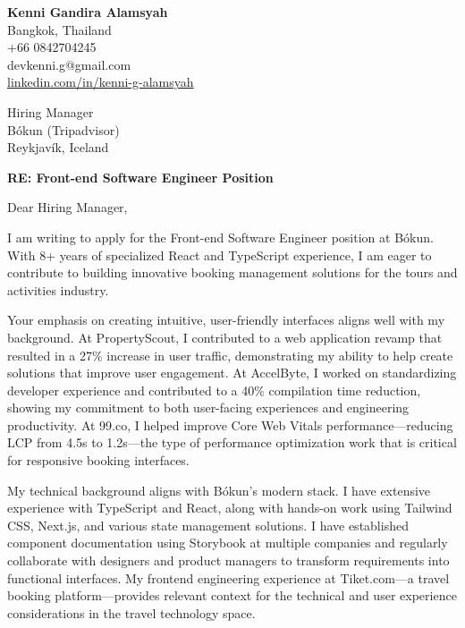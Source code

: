 \documentclass[11pt]{article}
\begin{document}
\begin{flushleft}
\textbf{Kenni Gandira Alamsyah}\\
Bangkok, Thailand\\
+66 0842704245\\
devkenni.g@gmail.com\\
\href{https://www.linkedin.com/in/kenni-g-alamsyah/}{linkedin.com/in/kenni-g-alamsyah}
\end{flushleft}

\vspace{1em}

\begin{flushleft}
Hiring Manager\\
Bókun (Tripadvisor)\\
Reykjavík, Iceland
\end{flushleft}

\vspace{1em}

\textbf{RE: Front-end Software Engineer Position}

\vspace{1em}

Dear Hiring Manager,

I am writing to apply for the Front-end Software Engineer position at Bókun. With 8+ years of specialized React and TypeScript experience, I am eager to contribute to building innovative booking management solutions for the tours and activities industry.

Your emphasis on creating intuitive, user-friendly interfaces aligns well with my background. At PropertyScout, I contributed to a web application revamp that resulted in a 27\% increase in user traffic, demonstrating my ability to help create solutions that improve user engagement. At AccelByte, I worked on standardizing developer experience and contributed to a 40\% compilation time reduction, showing my commitment to both user-facing experiences and engineering productivity. At 99.co, I helped improve Core Web Vitals performance—reducing LCP from 4.5s to 1.2s—the type of performance optimization work that is critical for responsive booking interfaces.

My technical background aligns with Bókun's modern stack. I have extensive experience with TypeScript and React, along with hands-on work using Tailwind CSS, Next.js, and various state management solutions. I have established component documentation using Storybook at multiple companies and regularly collaborate with designers and product managers to transform requirements into functional interfaces. My frontend engineering experience at Tiket.com—a travel booking platform—provides relevant context for the technical and user experience considerations in the travel technology space.
\end{document}
